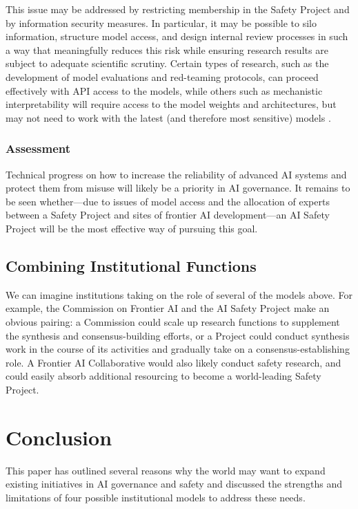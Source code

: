 \documentclass[12pt]{article}
\begin{document}
This issue may be addressed by restricting membership in the Safety
Project and by information security measures. In particular, it may be
possible to silo information, structure model access, and design
internal review processes in such a way that meaningfully reduces this
risk while ensuring research results are subject to adequate scientific
scrutiny. Certain types of research, such as the development of model
evaluations and red-teaming protocols, can proceed effectively with API
access to the models, while others such as mechanistic interpretability
will require access to the model weights and architectures, but may not
need to work with the latest (and therefore most sensitive)
models \cite{shevlane_structured_2022}.


\subsubsection*{Assessment}

Technical progress on how to increase the reliability of advanced AI
systems and protect them from misuse will likely be a priority in AI
governance. It remains to be seen whether---due to issues of model
access and the allocation of experts between a Safety Project and sites
of frontier AI development---an AI Safety Project will be the most
effective way of pursuing this goal.


\subsection{Combining Institutional
Functions}

We can imagine institutions taking on the role of several of the models
above. For example, the Commission on Frontier AI and the AI Safety
Project make an obvious pairing: a Commission could scale up research
functions to supplement the synthesis and consensus-building efforts, or
a Project could conduct synthesis work in the course of its activities
and gradually take on a consensus-establishing role. A Frontier AI
Collaborative would also likely conduct safety research, and could
easily absorb additional resourcing to become a world-leading Safety
Project.


\section{Conclusion}

This paper has outlined several reasons why the world may want to expand
existing initiatives in AI governance and safety and discussed the
strengths and limitations of four possible institutional models to
address these needs.
\end{document}
